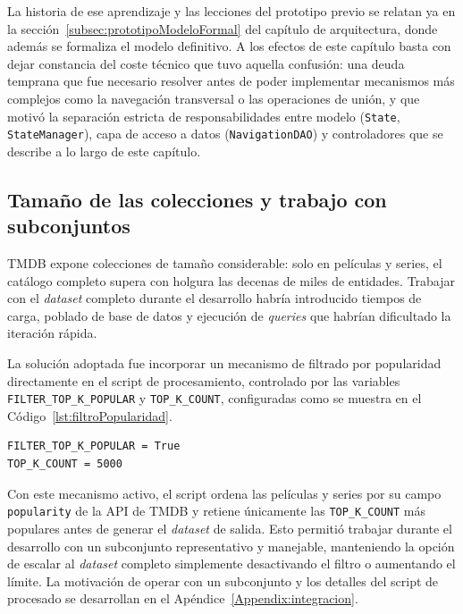 La historia de ese aprendizaje y las lecciones del prototipo previo se relatan ya en la
sección~\ref{subsec:prototipoModeloFormal} del capítulo de arquitectura, donde además se
formaliza el modelo definitivo. A los efectos de este capítulo basta con dejar constancia
del coste técnico que tuvo aquella confusión: una deuda temprana que fue necesario
resolver antes de poder implementar mecanismos más complejos como la navegación
transversal o las operaciones de unión, y que motivó la separación estricta de
responsabilidades entre modelo (\texttt{State}, \texttt{StateManager}), capa de acceso a
datos (\texttt{NavigationDAO}) y controladores que se describe a lo largo de este
capítulo.

    \subsection*{Tamaño de las colecciones y trabajo con subconjuntos}

TMDB expone colecciones de tamaño considerable: solo en películas y series, el catálogo
completo supera con holgura las decenas de miles de entidades. Trabajar con el \textit{dataset}
completo durante el desarrollo habría introducido tiempos de carga, poblado de base de
datos y ejecución de \textit{queries} que habrían dificultado la iteración rápida.

La solución adoptada fue incorporar un mecanismo de filtrado por popularidad directamente
en el script de procesamiento, controlado por las variables
\texttt{FILTER\_\allowbreak TOP\_\allowbreak K\_\allowbreak POPULAR}
y \texttt{TOP\_\allowbreak K\_\allowbreak COUNT}, configuradas como se muestra en el
Código~\ref{lst:filtroPopularidad}.

\begin{lstlisting}[style=pythonStyle, caption=Configuración del filtro por popularidad, label=lst:filtroPopularidad]
FILTER_TOP_K_POPULAR = True
TOP_K_COUNT = 5000
\end{lstlisting}

Con este mecanismo activo, el script ordena las películas y series por su campo
\texttt{popularity} de la API de TMDB y retiene únicamente las \texttt{TOP\_K\_COUNT}
más populares antes de generar el \textit{dataset} de salida. Esto permitió trabajar durante el
desarrollo con un subconjunto representativo y manejable, manteniendo la opción de
escalar al \textit{dataset} completo simplemente desactivando el filtro o aumentando el límite.
La motivación de operar con un subconjunto y los detalles del script
de procesado se desarrollan en el
Apéndice~\ref{Appendix:integracion}.

